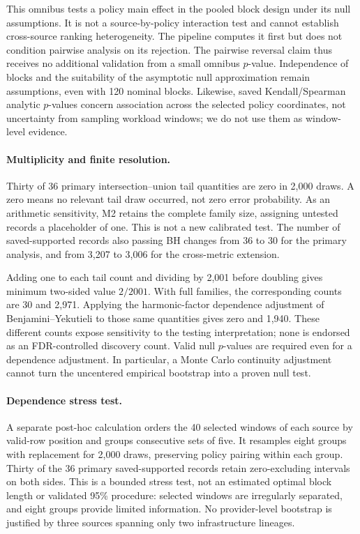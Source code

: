 This omnibus tests a policy main effect in the pooled block design under
its null assumptions. It is not a source-by-policy interaction test and
cannot establish cross-source ranking heterogeneity. The pipeline computes
it first but does not condition pairwise analysis on its rejection. The
pairwise reversal claim thus receives no additional validation from a
small omnibus $p$-value. Independence of blocks and the suitability of the
asymptotic null approximation remain assumptions, even with 120 nominal
blocks. Likewise, saved Kendall/Spearman analytic $p$-values concern
association across the selected policy coordinates, not uncertainty from
sampling workload windows; we do not use them as window-level evidence.

\paragraph{Multiplicity and finite resolution.}
Thirty of 36 primary intersection--union tail quantities are zero in
2,000 draws. A zero means no relevant tail draw occurred, not zero error
probability. As an arithmetic sensitivity, M2 retains the complete family
size, assigning untested records a placeholder of one. This is not a new
calibrated test. The number of saved-supported records also passing BH
changes from 36 to 30 for the primary analysis, and from 3,207 to 3,006 for
the cross-metric extension.

Adding one to each tail count and dividing by 2,001 before doubling gives
minimum two-sided value $2/2001$. With full families, the corresponding
counts are 30 and 2,971. Applying the harmonic-factor dependence adjustment
of Benjamini--Yekutieli to those same quantities gives zero and 1,940.
These different counts expose sensitivity to the testing interpretation;
none is endorsed as an FDR-controlled discovery count. Valid null
$p$-values are required even for a dependence adjustment. In particular,
a Monte Carlo continuity adjustment cannot turn the uncentered empirical
bootstrap into a proven null test.

\paragraph{Dependence stress test.}
A separate post-hoc calculation orders the 40 selected windows of each
source by valid-row position and groups consecutive sets of five. It
resamples eight groups with replacement for 2,000 draws, preserving policy
pairing within each group. Thirty of the 36 primary saved-supported
records retain zero-excluding intervals on both sides. This is a bounded
stress test, not an estimated optimal block length or validated 95\%
procedure: selected windows are irregularly separated, and eight groups
provide limited information. No provider-level bootstrap is justified by
three sources spanning only two infrastructure lineages.

